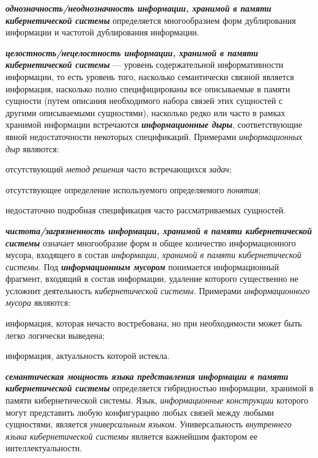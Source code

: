 \textbf{\textit{однозначность/неоднозначность информации, хранимой в памяти кибернетической системы}} определяется многообразием форм дублирования информации и частотой дублирования информации.

\textbf{\textit{целостность/нецелостность информации, хранимой в памяти кибернетической системы}} --- уровень содержательной информативности информации, то есть уровень того, насколько семантически связной является информация, насколько полно специфицированы все описываемые в памяти сущности (путем описания необходимого набора связей этих сущностей с другими описываемыми сущностями), насколько редко или часто в рамках хранимой информации встречаются \textbf{\textit{информационные дыры}}, соответствующие явной недостаточности некоторых спецификаций. 
Примерами \textit{информационных дыр} являются:
\begin{textitemize}
    \item отсутствующий \textit{метод решения} часто встречающихся \textit{задач};
    \item отсутствующее определение используемого определяемого \textit{понятия};
    \item недостаточно подробная спецификация часто рассматриваемых сущностей.
\end{textitemize}

\textbf{\textit{чистота/загрязненность информации, хранимой в памяти кибернетической системы}} означает многообразие форм и общее количество информационного мусора, входящего в состав \textit{информации, хранимой в памяти кибернетической системы}.
Под \textbf{\textit{информационным мусором}} понимается информационный фрагмент, входящий в состав информации, удаление которого существенно не усложнит деятельность \textit{кибернетической системы}.
Примерами \textit{информационного мусора} являются:
\begin{textitemize}
    \item информация, которая нечасто востребована, но при необходимости может быть легко логически выведена;
    \item информация, актуальность которой истекла.
\end{textitemize}

\textbf{\textit{семантическая мощность языка представления информации в памяти кибернетической системы}} определяется гибридностью информации, хранимой в памяти кибернетической системы. Язык, \textit{информационные конструкции} которого могут представить любую конфигурацию любых связей между любыми сущностями, является \textit{универсальным языком}.
Универсальность \textit{внутреннего языка кибернетической системы} является важнейшим фактором ее интеллектуальности.

